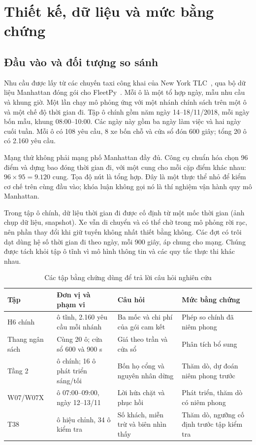\section{Thiết kế, dữ liệu và mức bằng chứng}


\subsection{Đầu vào và đối tượng so sánh}

Nhu cầu được lấy từ các chuyến taxi công khai của New York TLC~\cite{tlc}, qua bộ dữ
liệu Manhattan đóng gói cho FleetPy~\cite{fleetpy2022}. Mỗi ô là một tổ hợp ngày, mẫu nhu
cầu và khung giờ. Một lần chạy mô phỏng ứng với một nhánh chính sách trên một ô và một
chế độ thời gian đi. Tập ô chính gồm năm ngày 14--18/11/2018, mỗi ngày bốn mẫu, khung
08:00--10:00. Các ngày này gồm ba ngày làm việc và hai ngày cuối tuần. Mỗi ô có 108 yêu
cầu, 8 xe bốn chỗ và cửa sổ đón 600 giây; tổng 20 ô có 2.160 yêu cầu.

Mạng thử không phải mạng phố Manhattan đầy đủ. Công cụ chuẩn hóa chọn 96 điểm và dựng
bao đóng thời gian đi, với một cung cho mỗi cặp điểm khác nhau: $96\times95=9.120$ cung.
Tọa độ nút là tổng hợp. Đây là một thực thể nhỏ để kiểm cơ chế trên cùng đầu vào; khóa luận
không gọi nó là thí nghiệm vận hành quy mô Manhattan.

Trong tập ô chính, dữ liệu thời gian đi được cố định từ một mốc thời gian
(ảnh chụp dữ liệu, snapshot). Xe vẫn di chuyển và có thể chờ trong mô phỏng
rời rạc, nên phần thay đổi khi giữ tuyến không nhất thiết bằng không.
Các đợt có trôi dạt dùng hệ số thời gian đi theo ngày, mỗi 900 giây, áp chung cho mạng.
Chúng được tách khỏi tập ô tĩnh vì mô hình thông tin và các quy tắc thực thi khác nhau.

\begin{table}[htbp]
\centering
\caption{Các tập bằng chứng dùng để trả lời câu hỏi nghiên cứu}
\label{bang:lotrinh}
\small
\begin{tabularx}{\linewidth}{@{}>{\raggedright\arraybackslash}p{2.5cm}>{\raggedright\arraybackslash}p{3.4cm}>{\raggedright\arraybackslash}X>{\raggedright\arraybackslash}p{3.2cm}@{}}
\toprule
\textbf{Tập} & \textbf{Đơn vị và phạm vi} & \textbf{Câu hỏi} & \textbf{Mức bằng chứng}\\
\midrule
H6 chính & 20 ô tĩnh, 2.160 yêu cầu mỗi nhánh & Ba mốc và chi phí của gói cam kết & Phép so chính đã niêm phong\\
Thang ngân sách & Cùng 20 ô; cửa sổ 600 và 900 s & Giá theo trần và cửa sổ & Phân tích bổ sung\\
Tầng 2 & 20 ô chính; 16 ô phát triển sáng/tối & Bốn họ cổng và nguyên nhân dừng & Thăm dò, dự đoán niêm phong trước\\
W07/W07X & 8 ô 07:00--09:00, ngày 12--13/11 & Lời hứa chặt và phục hồi & Phát triển, thăm dò có niêm phong\\
T38 & 15 ô hiệu chỉnh, 34 ô kiểm tra & Số khách, miễn trừ và biên nhìn thấy & Thăm dò, ngưỡng cố định trước tập kiểm tra\\
\bottomrule
\end{tabularx}
\end{table}

